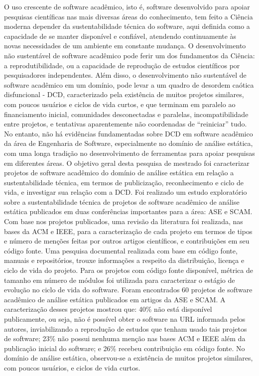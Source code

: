 O uso crescente de software acadêmico, isto é, software desenvolvido para
apoiar pesquisas científicas nas mais diversas áreas do conhecimento, tem feito
a Ciência moderna depender da sustentabilidade técnica do software, aqui
definida como a capacidade de se manter disponível e confiável, atendendo
continuamente às novas necessidades de um ambiente em constante mudança.
%
O desenvolvimento não sustentável de software acadêmico pode ferir um dos
fundamentos da Ciência: a reprodutibilidade, ou a capacidade de reprodução de
estudos científicos por pesquisadores independentes.
%
Além disso, o desenvolvimento não sustentável de software acadêmico em um
domínio, pode levar a um quadro de desordem caótica disfuncional - DCD,
caracterizado pela existência de muitos projetos similares, com poucos usuários
e ciclos de vida curtos, e que terminam em paralelo ao financiamento inicial,
comunidades desconectadas e paralelas, incompatibilidade entre projetos, e
tentativas aparentemente não coordenadas de ``reiniciar'' tudo.
%
No entanto, não há evidências fundamentadas sobre DCD em software acadêmico da
área de Engenharia de Software, especialmente no domínio de análise estática,
com uma longa tradição no desenvolvimento de ferramentas para apoiar pesquisas
em diferentes áreas.
%
O objetivo geral desta pesquisa de mestrado foi caracterizar projetos de
software acadêmico do domínio de análise estática em relação a sustentabilidade
técnica, em termos de publicização, reconhecimento e ciclo de vida, e investigar sua relação com a DCD.
%
Foi realizado um estudo exploratório sobre a sustentabilidade técnica de
projetos de software acadêmico de análise estática publicados em duas
conferências importantes para a área: ASE e SCAM.
%
Com base nos projetos publicados, uma revisão da literatura foi realizada, nas
bases da ACM e IEEE, para a caracterização de cada projeto em termos
de tipos e número de menções feitas por outros artigos científicos, e
contribuições em seu código fonte.
%
Uma pesquisa documental realizada com base em código fonte, manuais e
repositórios, trouxe informações a respeito da distribuição, licença e ciclo de
vida do projeto.
%
Para os projetos com código fonte disponível, métrica de tamanho em número
de módulos foi utilizada para caracterizar o estágio de evolução no ciclo de
vida do software.
%
Foram encontrados 60 projetos de software acadêmico de análise estática
publicados em artigos da ASE e SCAM.
%
A caracterização desses projetos mostrou que: 40\% não está disponível
publicamente, ou seja, não é possível obter o software na URL informada pelos
autores, inviabilizando a reprodução de estudos que tenham usado tais projetos
de software;
%
23\% não possui nenhuma menção nas bases ACM e IEEE além da publicação inicial
do software; e 26\% recebeu contribuição em código fonte.
%
No domínio de análise estática, observou-se a existência de muitos projetos
similares, com poucos usuários, e ciclos de vida curtos.
